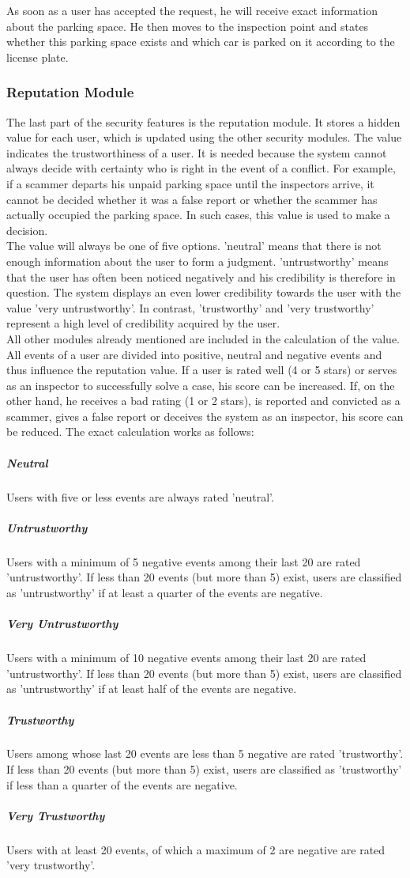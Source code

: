\documentclass[
a4paper,     %
titlepage,   %
14pt         %
]{scrartcl}  %
\theoremstyle{mystyle}
\begin{document}
As soon as a user has accepted the request, he will receive exact information about the parking space. He then moves to the inspection point and states whether this parking space exists and which car is parked on it according to the license plate.

\subsubsection{Reputation Module} The last part of the security features is the reputation module. It stores a hidden value for each user, which is updated using the other security modules. The value indicates the trustworthiness of a user. It is needed because the system cannot always decide with certainty who is right in the event of a conflict. For example, if a scammer departs his unpaid parking space until the inspectors arrive, it cannot be decided whether it was a false report or whether the scammer has actually occupied the parking space. In such cases, this value is used to make a decision. \\

The value will always be one of five options. 'neutral' means that there is not enough information about the user to form a judgment. 'untrustworthy' means that the user has often been noticed negatively and his credibility is therefore in question. The system displays an even lower credibility towards the user with the value 'very untrustworthy'. In contrast, 'trustworthy' and 'very trustworthy' represent a high level of credibility acquired by the user. \\

All other modules already mentioned are included in the calculation of the value. All events of a user are divided into positive, neutral and negative events and thus influence the reputation value. If a user is rated well (4 or 5 stars) or serves as an inspector to successfully solve a case, his score can be increased. If, on the other hand, he receives a bad rating (1 or 2 stars), is reported and convicted as a scammer, gives a false report or deceives the system as an inspector, his score can be reduced. The exact calculation works as follows: \\

\subparagraph{Neutral} Users with five or less events are always rated 'neutral'.
\subparagraph{Untrustworthy} Users with a minimum of 5 negative events among their last 20 are rated 'untrustworthy'. If less than 20 events (but more than 5) exist, users are classified as 'untrustworthy' if at least a quarter of the events are negative.
\subparagraph{Very Untrustworthy} Users with a minimum of 10 negative events among their last 20 are rated 'untrustworthy'. If less than 20 events (but more than 5) exist, users are classified as 'untrustworthy' if at least half of the events are negative.
\subparagraph{Trustworthy} Users among whose last 20 events are less than 5 negative are rated 'trustworthy'. If less than 20 events (but more than 5) exist, users are classified as 'trustworthy' if less than a quarter of the events are negative.
\subparagraph{Very Trustworthy} Users with at least 20 events, of which a maximum of 2 are negative are rated 'very trustworthy'.
\end{document}
